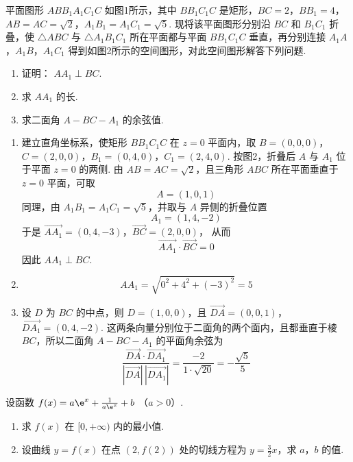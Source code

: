 \begin{problem}
平面图形 \(ABB_{1}A_{1}C_{1}C\) 如图1所示，其中 \(BB_{1}C_{1}C\) 是矩形，\(BC = 2\)，\(BB_{1} = 4\)，\(AB = AC = \sqrt{2}\)，\(A_{1}B_{1} = A_{1}C_{1} = \sqrt{5}\). 现将该平面图形分别沿 \(BC\) 和 \(B_{1}C_{1}\) 折叠，使 \(\triangle ABC\) 与 \(\triangle A_{1}B_{1}C_{1}\) 所在平面都与平面 \(BB_{1}C_{1}C\) 垂直，再分别连接 \(A_{1}A\)，\(A_{1}B\)，\(A_{1}C_{1}\) 得到如图2所示的空间图形，对此空间图形解答下列问题.

\begin{enumerate}
\item 证明： \( AA_{1} \perp BC\).
\item 求 \(AA_{1}\) 的长.
\item 求二面角 \( A - BC - A_{1} \) 的余弦值.
\end{enumerate}

\end{problem}

\begin{solution}
\begin{enumerate}
\item 建立直角坐标系，使矩形 \(BB_{1}C_{1}C\) 在 \(z=0\) 平面内，取
\(B=(0,0,0)\)，\(C=(2,0,0)\)，\(B_{1}=(0,4,0)\)，\(C_{1}=(2,4,0)\).
按图2，折叠后 \(A\) 与 \(A_{1}\) 位于平面 \(z=0\) 的两侧. 由 \(AB=AC=\sqrt2\)，且三角形 \(ABC\) 所在平面垂直于 \(z=0\) 平面，可取
\[
A=(1,0,1)
\]
同理，由 \(A_{1}B_{1}=A_{1}C_{1}=\sqrt5\)，并取与 \(A\) 异侧的折叠位置
\[
A_{1}=(1,4,-2)
\]
于是
\(\overrightarrow{AA_{1}}=(0,4,-3)\)，\(\overrightarrow{BC}=(2,0,0)\)，
从而
\[
\overrightarrow{AA_{1}}\cdot\overrightarrow{BC}=0
\]
因此 \(AA_{1}\perp BC\).
\item
\[
AA_{1}=\sqrt{0^2+4^2+(-3)^2}=5
\]
\item 设 \(D\) 为 \(BC\) 的中点，则 \(D=(1,0,0)\)，且
\(\overrightarrow{DA}=(0,0,1)\)，\(\overrightarrow{DA_{1}}=(0,4,-2)\).
这两条向量分别位于二面角的两个面内，且都垂直于棱 \(BC\)，所以二面角 \(A-BC-A_{1}\) 的平面角余弦为
\[
\frac{\overrightarrow{DA}\cdot\overrightarrow{DA_{1}}}
{|\overrightarrow{DA}|\,|\overrightarrow{DA_{1}}|}
=\frac{-2}{1\cdot\sqrt{20}}
=-\frac{\sqrt5}{5}
\]
\end{enumerate}
\end{solution}

\begin{problem}
设函数 \( f(x) = a\e^{x} + \frac{1}{a\e^{x}} + b  \) （\(a > 0\)）.

\begin{enumerate}
\item 求 \( f(x) \) 在 \( [0, +\infty) \) 内的最小值.
\item 设曲线 \( y = f(x) \) 在点 \( (2, f(2)) \) 处的切线方程为 \( y = \frac{3}{2} x \)，求 \(a\)，\(b\) 的值.
\end{enumerate}
\end{problem}

